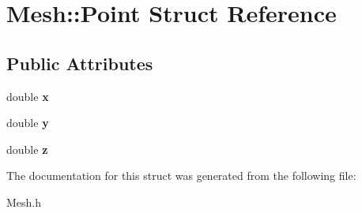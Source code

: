 \hypertarget{struct_mesh_1_1_point}{
\section{Mesh::Point Struct Reference}
\label{struct_mesh_1_1_point}
}
\subsection*{Public Attributes}
\begin{DoxyCompactItemize}
\item 
\hypertarget{struct_mesh_1_1_point_afde7368c09e8f4ad8a0939a60abcdfd5}{
double {\bfseries x}}
\label{struct_mesh_1_1_point_afde7368c09e8f4ad8a0939a60abcdfd5}

\item 
\hypertarget{struct_mesh_1_1_point_a0134d48d7aa58ddeef279ddc5828d7d8}{
double {\bfseries y}}
\label{struct_mesh_1_1_point_a0134d48d7aa58ddeef279ddc5828d7d8}

\item 
\hypertarget{struct_mesh_1_1_point_af1a7632846c57dee2fd111e86a30520e}{
double {\bfseries z}}
\label{struct_mesh_1_1_point_af1a7632846c57dee2fd111e86a30520e}

\end{DoxyCompactItemize}


The documentation for this struct was generated from the following file:\begin{DoxyCompactItemize}
\item 
Mesh.h\end{DoxyCompactItemize}
